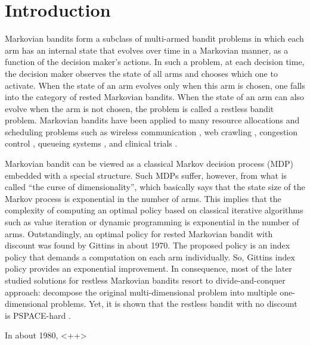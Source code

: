 \chapter{Introduction}
\label{chapter:introduction}

Markovian bandits form a subclass of multi-armed bandit problems in which each arm has an internal state that evolves over time in a Markovian manner, as a function of the decision maker’s actions.
In such a problem, at each decision time, the decision maker observes the state of all arms and chooses which one to activate.
When the state of an arm evolves only when this arm is chosen, one falls into the category of rested Markovian bandits.
When the state of an arm can also evolve when the arm is not chosen, the problem is called a restless bandit problem.
Markovian bandits have been applied to many resource allocations and scheduling problems such as wireless communication \cite{raghunathan2008index, liu2010indexability, aalto2019whittle}, web crawling \cite{nino2014dynamic, avrachenkov2022whittle}, congestion control \cite{avrachenkov2013congestion, avrachenkov2018impulsive}, queueing systems \cite{glazebrook2009index, aalto2009gittins, archibald2009indexability, aalto2011properties, larranaga2015asymptotically, borkar2017whittle, scully2018soap}, and clinical trials \cite{villar2015multi}.

Markovian bandit can be viewed as a classical Markov decision process (MDP) embedded with a special structure.
Such MDPs suffer, however, from what is called ``the curse of dimensionality'', which basically says that the state size of the Markov process is exponential in the number of arms.
This implies that the complexity of computing an optimal policy based on classical iterative algorithms such as value iteration or dynamic programming is exponential in the number of arms.
Outstandingly, an optimal policy for rested Markovian bandit with discount was found by Gittins \cite{gittins1979bandit} in about 1970.
The proposed policy is an index policy that demands a computation on each arm individually.
So, Gittins index policy provides an exponential improvement.
In consequence, most of the later studied solutions for restless Markovian bandits resort to divide-and-conquer approach: decompose the original multi-dimensional problem into multiple one-dimensional problems.
Yet, it is shown that the restless bandit with no discount is PSPACE-hard \cite[Theorem~4]{papadimitriou1994complexity}.

In about 1980, <++>



